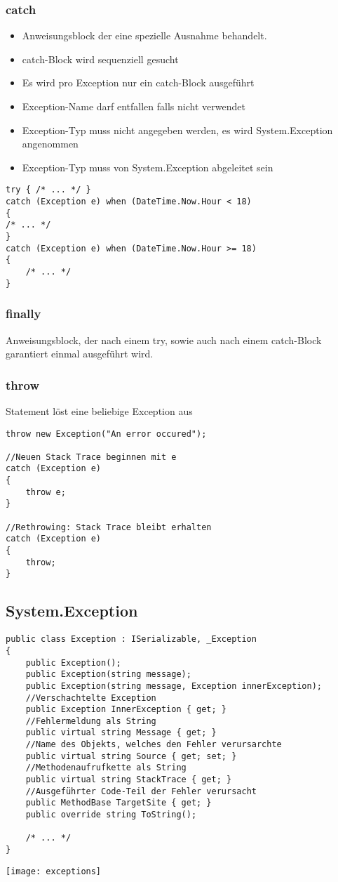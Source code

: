 \begin{multicols*}{2}
\subsubsection{catch}
\begin{itemize}
    \item Anweisungsblock der eine spezielle Ausnahme behandelt.
    \item catch-Block wird sequenziell gesucht
    \item Es wird pro Exception nur ein catch-Block ausgeführt
    \item Exception-Name darf entfallen falls nicht verwendet
    \item Exception-Typ muss nicht angegeben werden, es wird System.Exception angenommen
    \item Exception-Typ muss von System.Exception abgeleitet sein
\end{itemize}
\begin{lstlisting}
try { /* ... */ }
catch (Exception e) when (DateTime.Now.Hour < 18) 
{
/* ... */
}
catch (Exception e) when (DateTime.Now.Hour >= 18)
{
    /* ... */
}
\end{lstlisting}
\subsubsection{finally}
Anweisungsblock, der nach einem try, sowie auch nach einem catch-Block garantiert einmal ausgeführt wird.
\subsubsection{throw}
Statement löst eine beliebige Exception aus
\begin{lstlisting}
throw new Exception("An error occured");

//Neuen Stack Trace beginnen mit e
catch (Exception e) 
{
    throw e; 
}

//Rethrowing: Stack Trace bleibt erhalten
catch (Exception e) 
{
    throw; 
}
\end{lstlisting}

\subsection*{System.Exception}
\begin{lstlisting}
public class Exception : ISerializable, _Exception
{
    public Exception();
    public Exception(string message);
    public Exception(string message, Exception innerException);
    //Verschachtelte Exception
    public Exception InnerException { get; } 
    //Fehlermeldung als String
    public virtual string Message { get; } 
    //Name des Objekts, welches den Fehler verursarchte
    public virtual string Source { get; set; } 
    //Methodenaufrufkette als String
    public virtual string StackTrace { get; } 
    //Ausgeführter Code-Teil der Fehler verursacht
    public MethodBase TargetSite { get; }
    public override string ToString();

    /* ... */
}
\end{lstlisting}
\texttt{[image: exceptions]}
\end{multicols*}